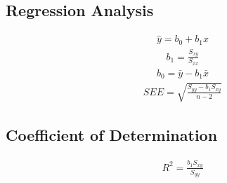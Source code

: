 \documentclass[twocolumn]{article}
\begin{document}
\subsection{Regression Analysis}
\begin{align*}
    \hat{y} = b_{0} + b_{1}x
\end{align*}
\begin{align*}
    b_{1} = \frac{S_{xy}}{S_{xx}}
\end{align*}
\begin{align*}
    b_{0} = \bar{y} - b_{1}\bar{x}
\end{align*}
\begin{align*}
    SEE = \sqrt{\frac{S_{yy} - b_{1} S_{xy}}{n-2}}
\end{align*}
\subsection{Coefficient of Determination}
\begin{align*}
    R^{2} = \frac{b_{1}S_{xy}}{S_{yy}}
\end{align*}
\end{document}
